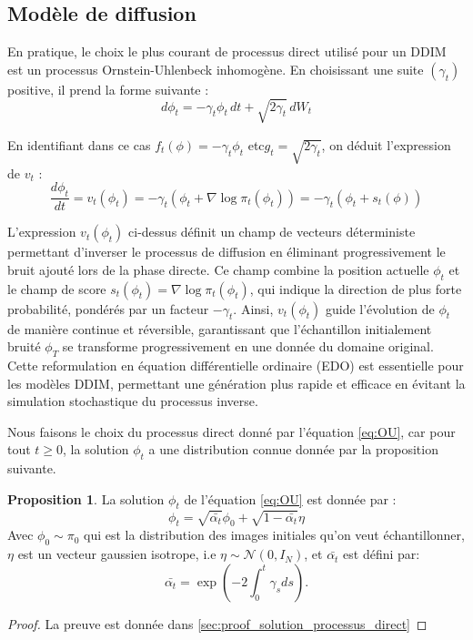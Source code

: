 \documentclass[a4paper,10pt]{article}
\theoremstyle{definition} %
\theoremstyle{definition} %
\newtheorem{proposition}[definition]{Proposition}
\theoremstyle{definition} %
\theoremstyle{definition} %
\begin{document}
\subsection{Modèle de diffusion}
En pratique, le choix le plus courant de processus direct utilisé pour un DDIM est un processus Ornstein-Uhlenbeck inhomogène. En choisissant une suite $(\gamma_t)$ positive, il prend la forme suivante :
\begin{equation}\label{eq:OU}
    d\phi_t = -\gamma_t\phi_t \,dt + \sqrt{2\gamma_t}\,dW_t
\end{equation}

En identifiant dans ce cas $f_t(\phi) = -\gamma_t\phi_t$ etc$ g_t =  \sqrt{2\gamma_t}$, on déduit l'expression de $v_t$ :
\begin{equation}\label{eq:backward}
    \frac{d\phi_t}{dt} = v_t(\phi_t) = -\gamma_t(\phi_t+\nabla \log \pi_t(\phi_t)) = -\gamma_t(\phi_t+s_t(\phi))
\end{equation}

L'expression \( v_t(\phi_t) \) ci-dessus définit un champ de vecteurs déterministe permettant d'inverser le processus de diffusion en éliminant progressivement le bruit ajouté lors de la phase directe. Ce champ combine la position actuelle \( \phi_t \) et le champ de score \( s_t(\phi_t) = \nabla \log \pi_t(\phi_t) \), qui indique la direction de plus forte probabilité, pondérés par un facteur \( -\gamma_t \). Ainsi, \( v_t(\phi_t) \) guide l'évolution de \( \phi_t \) de manière continue et réversible, garantissant que l'échantillon initialement bruité \( \phi_T \) se transforme progressivement en une donnée du domaine original. Cette reformulation en équation différentielle ordinaire (EDO) est essentielle pour les modèles DDIM, permettant une génération plus rapide et efficace en évitant la simulation stochastique du processus inverse.

Nous faisons le choix du processus direct donné par l'équation \eqref{eq:OU}, car pour tout $t \geq 0$, la solution $\phi_t$ a une distribution connue donnée par la proposition suivante.
\begin{proposition}\label{prop:solution_processus_direct}
    La solution $\phi_t$ de l'équation \eqref{eq:OU} est donnée par :
    \begin{equation}\label{eq:solforphi}
        \phi_t = \sqrt{\bar{\alpha_t}}\phi_0 + \sqrt{1-\bar{\alpha_t}}\eta
    \end{equation}
    Avec $\phi_0 \sim \pi_0$ qui est la distribution des images initiales qu'on veut échantillonner, $\eta$ est un vecteur gaussien isotrope, i.e $\eta \sim \mathcal{N}(0, I_N)$, et $\bar{\alpha_t}$ est défini par: \[\bar{\alpha_t} = \exp{\left(-2\int_0^t \gamma_s ds\right)}.\]
    
\end{proposition}
\begin{proof}
    La preuve est donnée dans \cref{sec:proof_solution_processus_direct}
\end{proof}
\end{document}
